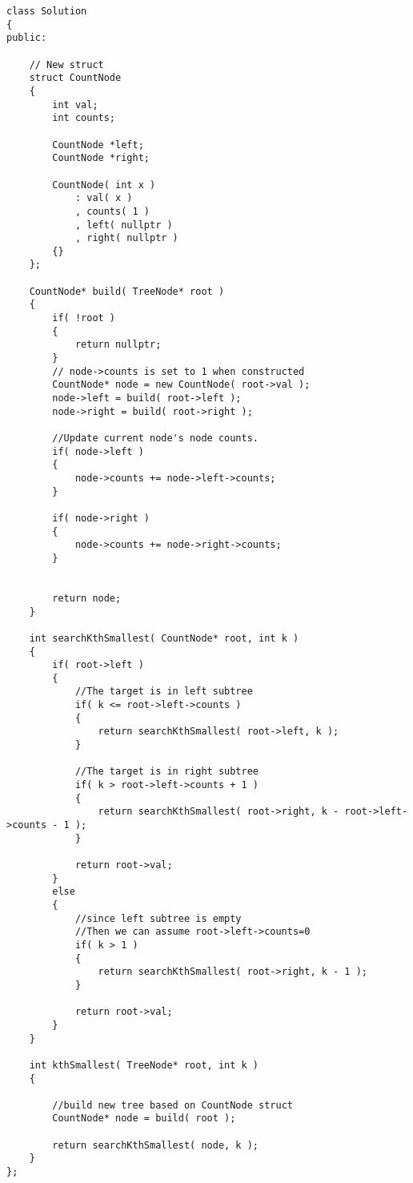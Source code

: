 \begin{lstlisting}[style=customc, caption={Follow Up}]
class Solution
{
public:

    // New struct
    struct CountNode
    {
        int val;
        int counts;

        CountNode *left;
        CountNode *right;

        CountNode( int x )
            : val( x )
            , counts( 1 )
            , left( nullptr )
            , right( nullptr )
        {}
    };

    CountNode* build( TreeNode* root )
    {
        if( !root )
        {
            return nullptr;
        }
        // node->counts is set to 1 when constructed
        CountNode* node = new CountNode( root->val );
        node->left = build( root->left );
        node->right = build( root->right );

        //Update current node's node counts.
        if( node->left )
        {
            node->counts += node->left->counts;
        }

        if( node->right )
        {
            node->counts += node->right->counts;
        }


        return node;
    }

    int searchKthSmallest( CountNode* root, int k )
    {
        if( root->left )
        {
            //The target is in left subtree
            if( k <= root->left->counts )
            {
                return searchKthSmallest( root->left, k );
            }

            //The target is in right subtree
            if( k > root->left->counts + 1 )
            {
                return searchKthSmallest( root->right, k - root->left->counts - 1 );
            }

            return root->val;
        }
        else
        {
            //since left subtree is empty
            //Then we can assume root->left->counts=0
            if( k > 1 )
            {
                return searchKthSmallest( root->right, k - 1 );
            }

            return root->val;
        }
    }

    int kthSmallest( TreeNode* root, int k )
    {

        //build new tree based on CountNode struct
        CountNode* node = build( root );

        return searchKthSmallest( node, k );
    }
};
\end{lstlisting}